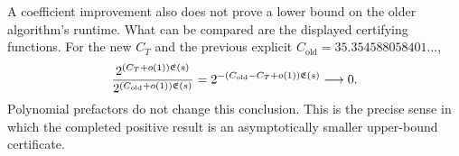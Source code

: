 A coefficient improvement also does not prove a lower bound on the
older algorithm's runtime. What can be compared are the displayed
certifying functions. For the new $C_T$ and the previous explicit
$C_{\mathrm{old}}=35.354588058401\ldots$,
\[
 \frac{2^{(C_T+o(1))\mathfrak E(s)}}
      {2^{(C_{\mathrm{old}}+o(1))\mathfrak E(s)}}
 =2^{-(C_{\mathrm{old}}-C_T+o(1))\mathfrak E(s)}
 \longrightarrow0.
\]
Polynomial prefactors do not change this conclusion. This is the
precise sense in which the completed positive result is an asymptotically
smaller upper-bound certificate.
